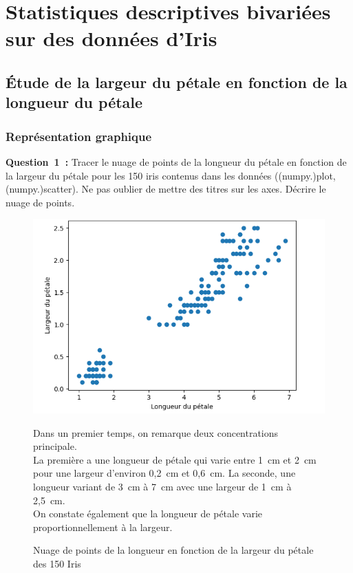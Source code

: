 \section{Statistiques descriptives bivariées sur des données d’Iris}
\subsection{Étude de la largeur du pétale en fonction de la longueur du pétale}
\subsubsection*{Représentation graphique}
\vspace{.2cm}

\noindent
\textbf{Question~1~:} Tracer le nuage de points de la longueur du pétale en fonction de la largeur du pétale
pour les 150 iris contenus dans les données ((numpy.)plot, (numpy.)scatter). Ne pas oublier de
mettre des titres sur les axes. Décrire le nuage de points.
\vspace{.2cm}


\begin{figure}[!h]
    \centering
    \begin{minipage}{.60\linewidth}
        \begin{center}
            \includegraphics[width=1\textwidth]{img/Figure_1.png}
            \caption{\label{fig:figure1}Nuage de points de la longueur en fonction de la largeur du pétale des 150 Iris}
        \end{center}
    \end{minipage}\hfill
    \begin{minipage}{.36\linewidth}
        Dans un premier temps, on remarque deux concentrations principale. \\
        La première a une longueur de pétale qui varie entre 1~cm et 2~cm pour une largeur d’environ 0,2~cm et 0,6~cm. La seconde, une longueur variant de 3~cm à 7~cm avec une largeur de 
        1~cm à 2,5~cm. \\

        \noindent
        On constate également que la longueur de pétale varie proportionnellement à la largeur.
    \end{minipage}
\end{figure}

